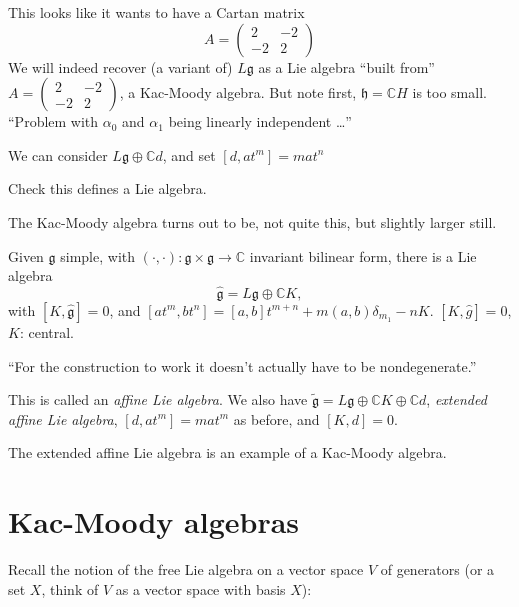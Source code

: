 This looks like it wants to have a Cartan matrix
 $$
A=\begin{pmatrix}
2&-2\\ 
-2&2
\end{pmatrix}
$$
We will indeed recover (a variant of) $L\mathfrak{g}$ as a Lie algebra 
``built from'' $A=\begin{pmatrix}
2&-2\\ 
-2&2
\end{pmatrix}$,
 a Kac-Moody algebra. 
But note first, $\mathfrak{h}=\mathbb{C}H$ is too small.
``Problem with $\alpha_0$ and $\alpha_1$ being linearly independent  …''

We can consider $L\mathfrak{g}\oplus\mathbb{C}d$, and set 
$[d,at^m]=mat^n$ 

\begin{exercise}
\label{exercise-this-defines-a-Lie-algebra}
Check this defines a Lie algebra.
\end{exercise}

The Kac-Moody algebra turns out to be, not quite this, but slightly larger
still.

\medskip\noindent
\begin{definition}
\label{definition-}
Given $\mathfrak{g}$ simple, with 
$(\cdot,\cdot):\mathfrak{g} \times \mathfrak{g} \to \mathbb{C}$ 
invariant bilinear form, there is a Lie algebra 
$$
\hat{\mathfrak{g}}=L\mathfrak{g} \oplus \mathbb{C}K,
$$
with $[K,\hat{\mathfrak{g}}]=0$, and 
$[at^m,bt^n]=[a,b]t^{m+n}+m(a,b)\delta_{m_1}-nK$.
$[K,\hat{g}]=0$, $K$: central.

``For the construction to work it doesn't actually have to be nondegenerate.''

This is called an {\it affine Lie algebra}. We also have
$\tilde{\mathfrak{g}}=L\mathfrak{g} \oplus \mathbb{C}K \oplus \mathbb{C}d$, 
{\it extended affine Lie algebra}, $[d,at^m]=m a t^m$ as before, and 
$[K,d]=0$.
\end{definition}

The extended affine Lie algebra is an example of a Kac-Moody algebra.

\section{Kac-Moody algebras}
\label{section-Kac-Moody-algebras-again}

Recall the notion of the free Lie algebra on a 
vector space $V$ of generators 
(or a set $X$, think of $V$ as a vector space with basis $X$):

